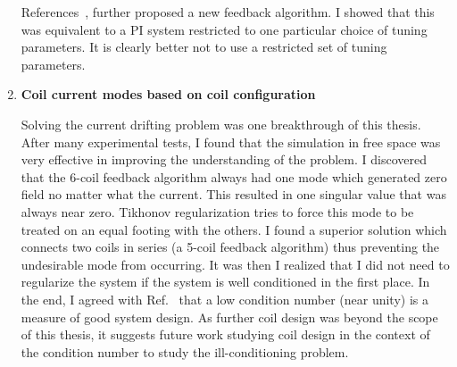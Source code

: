 \begin{enumerate}
References~\cite{rawlik,rawlikpriv}, further proposed a new feedback algorithm. I showed that this was equivalent to a PI system restricted to one particular choice of tuning parameters. It is clearly better not to use a restricted set of tuning parameters.



\item {\bf Coil current modes based on coil configuration}  

Solving the current drifting problem was one breakthrough of this thesis. After many experimental tests, I found that the simulation in free space was very effective in improving the understanding of the problem. I discovered that the 6-coil feedback algorithm always had one mode which generated zero field no matter what the current. This resulted in one singular value that was always near zero. Tikhonov regularization tries to force this mode to be treated on an equal footing with the others. I found a superior solution which connects two coils in series (a 5-coil feedback algorithm) thus preventing the undesirable mode from occurring. It was then I realized that I did not need to regularize the system if the system is well conditioned in the first place. In the end, I agreed with Ref.~\cite{rawlik} that a low condition number (near unity) is a measure of good system design. As further coil design was beyond the scope of this thesis, it suggests future work studying coil design in the context of the condition number to study the ill-conditioning problem.

\end{enumerate}



